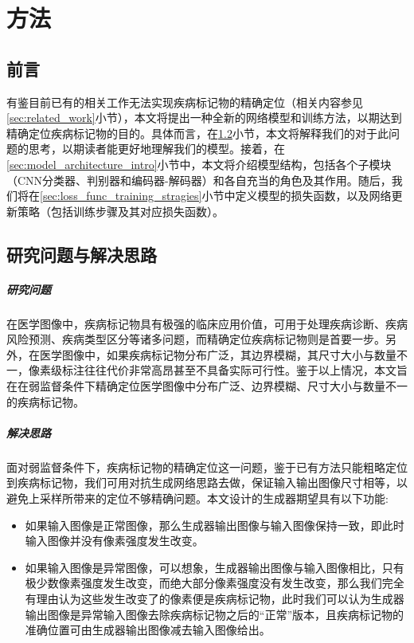 \chapter{方法}\label{sec:method}
\section{前言}

有鉴目前已有的相关工作无法实现疾病标记物的精确定位（相关内容参见\ref{sec:related_work}小节），本文将提出一种全新的网络模型和训练方法，以期达到精确定位疾病标记物的目的。具体而言，在\ref{sec:idea_thinking}小节，本文将解释我们的对于此问题的思考，以期读者能更好地理解我们的模型。接着，在\ref{sec:model_architecture_intro}小节中，本文将介绍模型结构，包括各个子模块（CNN分类器、判别器和编码器-解码器）和各自充当的角色及其作用。随后，我们将在\ref{sec:loss_func_training_stragies}小节中定义模型的损失函数，以及网络更新策略（包括训练步骤及其对应损失函数）。


\section{研究问题与解决思路}\label{sec:idea_thinking}
\paragraph{研究问题} 在医学图像中，疾病标记物具有极强的临床应用价值，可用于处理疾病诊断、疾病风险预测、疾病类型区分等诸多问题，而精确定位疾病标记物则是首要一步。另外，在医学图像中，如果疾病标记物分布广泛，其边界模糊，其尺寸大小与数量不一，像素级标注往往代价非常高昂甚至不具备实际可行性。鉴于以上情况，本文旨在在弱监督条件下精确定位医学图像中分布广泛、边界模糊、尺寸大小与数量不一的疾病标记物。

\paragraph{解决思路} 面对弱监督条件下，疾病标记物的精确定位这一问题，鉴于已有方法只能粗略定位到疾病标记物，我们可用对抗生成网络思路去做，保证输入输出图像尺寸相等，以避免上采样所带来的定位不够精确问题。本文设计的生成器期望具有以下功能:

\begin{itemize}
	\item 如果输入图像是正常图像，那么生成器输出图像与输入图像保持一致，即此时输入图像并没有像素强度发生改变。
	
	\item 如果输入图像是异常图像，可以想象，生成器输出图像与输入图像相比，只有极少数像素强度发生改变，而绝大部分像素强度没有发生改变，那么我们完全有理由认为这些发生改变了的像素便是疾病标记物，此时我们可以认为生成器输出图像是异常输入图像去除疾病标记物之后的“正常”版本，且疾病标记物的准确位置可由生成器输出图像减去输入图像给出。 
\end{itemize}

